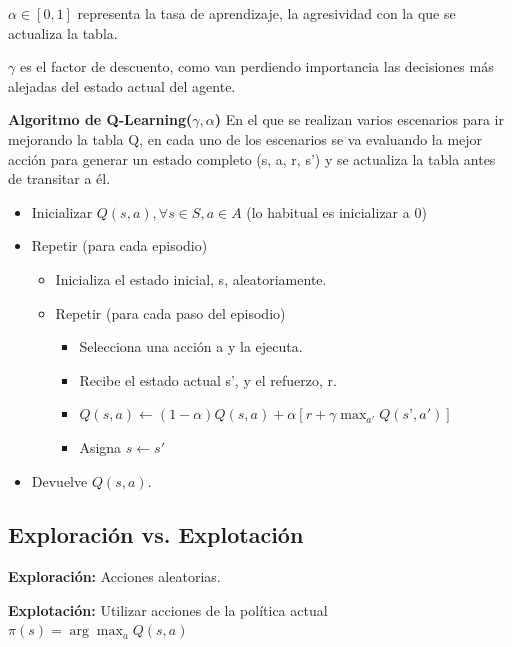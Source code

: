 \documentclass[12pt, twoside, openright]{report} %
\begin{document}
$\alpha \in [0,1]$ representa la tasa de aprendizaje, la agresividad con la que se actualiza la tabla.

$\gamma$ es el factor de descuento, como van perdiendo importancia las decisiones más alejadas del estado actual del agente.

\textbf{Algoritmo de Q-Learning($\gamma, \alpha$)}
En el que se realizan varios escenarios para ir mejorando la tabla Q, en cada uno de los escenarios se va evaluando la mejor acción para generar un estado completo (s, a, r, s') y se actualiza la tabla antes de transitar a él.
\begin{itemize}
	\item Inicializar $Q(s, a), \forall s \in S, a \in A$ (lo habitual es inicializar a 0)
	\item Repetir (para cada episodio)
	      \begin{itemize}
		      \item Inicializa el estado inicial, s, aleatoriamente.
		      \item Repetir (para cada paso del episodio)
		            \begin{itemize}
			            \item Selecciona una acción a y la ejecuta.
			            \item Recibe el estado actual s', y el refuerzo, r.
			            \item $Q(s, a) \leftarrow (1-\alpha) Q(s, a) + \alpha[r + \gamma \max_{a'} Q(s’, a')]$
			            \item Asigna $s \leftarrow s'$
		            \end{itemize}
	      \end{itemize}
	\item Devuelve $Q(s, a)$.
\end{itemize}

\subsection{Exploración vs. Explotación}

\textbf{Exploración:} Acciones aleatorias.

\textbf{Explotación:} Utilizar acciones de la política actual $\pi (s)=\arg \max _a Q (s, a)$
\end{document}
